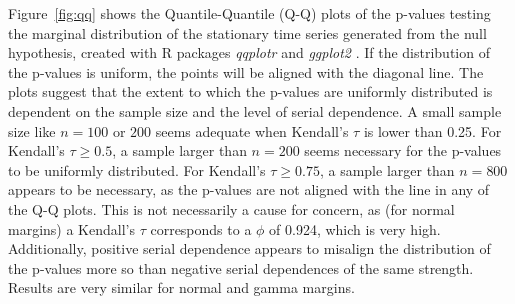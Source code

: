 \documentclass[12pt]{article}
\begin{document}
Figure~\ref{fig:qq} shows the Quantile-Quantile (Q-Q)
plots of the p-values testing the marginal distribution of the stationary time
series generated from the null hypothesis, created with R packages
\textsl{qqplotr} and \textsl{ggplot2} \citep{qqplotr, ggplot2}. If the
distribution of the p-values is uniform, the points will be aligned with the
diagonal line. The plots suggest that the extent to which the p-values are
uniformly distributed is dependent on the sample size and the level of serial
dependence.
A small sample size like $n = 100$ or $200$ seems adequate when Kendall's
$\tau$ is lower than 0.25. For Kendall's $\tau \geq 0.5$, a sample larger than
$n = 200$ seems necessary for the p-values to be uniformly distributed. For
Kendall's $\tau \geq 0.75$, a sample larger than $n = 800$ appears to be
necessary, as the p-values are not aligned with the line in any of the Q-Q
plots. This
is not necessarily a cause for concern, as (for normal margins)
a Kendall's $\tau$ corresponds to
a $\phi$ of 0.924, which is very high.
Additionally, positive serial dependence appears to misalign the distribution
of the p-values more so than negative serial dependences of the same strength.
Results are very similar for normal and gamma margins.
\end{document}
